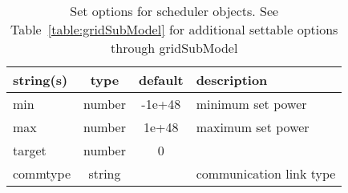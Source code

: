 \begin{table}[ht]
\centering
\begin{tabular}{p{5cm} c c p{7cm}}
\hline
string(s) & type & default & description \\
\hline
min & number & -1e+48 & minimum set power\\
max & number & 1e+48 & maximum set power\\
target & number & 0 & \\
commtype & string &  & communication link type\\
\hline
\end{tabular}
\caption{Set options for scheduler objects. See Table~\ref{table:gridSubModel} for additional settable options through gridSubModel}
\label{table:scheduler}
\end{table}

